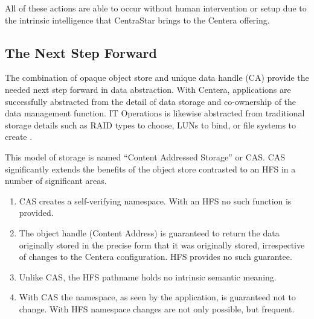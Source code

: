 All of these actions are able to occur without human intervention or
setup due to the intrinsic intelligence that CentraStar brings to the
Centera offering.

\subsection{The Next Step Forward}

The combination of opaque object store and unique data handle (CA)
provide the needed next step forward in data abstraction. With Centera,
applications are successfully abstracted from the detail of data storage
and co-ownership of the data management function. IT Operations is
likewise abstracted from traditional storage details such as RAID types
to choose, LUNs to bind, or file systems to create \cite{ref8}.

This model of storage is named ``Content Addressed Storage'' or CAS. CAS
significantly extends the benefits of the object store contrasted to an
HFS in a number of significant areas.

\begin{enumerate}
\def\labelenumi{\arabic{enumi}.}
\item
  CAS creates a self-verifying namespace. With an HFS no such function
  is provided.
\item
  The object handle (Content Address) is guaranteed to return the data
  originally stored in the precise form that it was originally stored,
  irrespective of changes to the Centera configuration. HFS provides no
  such guarantee.
\item
  Unlike CAS, the HFS pathname holds no intrinsic semantic meaning.
\item
  With CAS the namespace, as seen by the application, is guaranteed not
  to change. With HFS namespace changes are not only possible, but
  frequent.
\end{enumerate}
